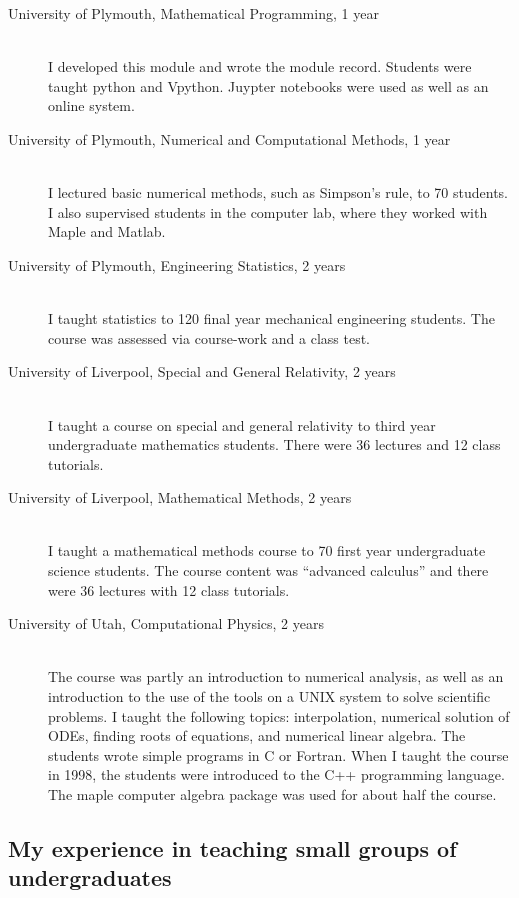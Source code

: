 \documentclass[12pt]{article}
\begin{document}
\begin{description}
  \item[University of Plymouth, Mathematical Programming,
1 year] \hfill \\
I developed this module and wrote the module record. Students
were taught python and Vpython. Juypter notebooks were used as well
as an online system.

  \item[University of Plymouth, Numerical and Computational Methods,
1 year] \hfill \\
I lectured basic numerical methods,
such as Simpson's rule,
 to 70 students. I also supervised
students in the computer lab, where they worked with Maple
and Matlab.

  \item[University of Plymouth, Engineering Statistics,
2 years] \hfill \\
I taught statistics to 120 final year mechanical engineering 
students. The course was assessed via course-work and a class 
test.

  \item[University of Liverpool, Special and General
Relativity,
2 years] \hfill \\
I taught a course on special and general
relativity to third year undergraduate mathematics students. 
There were 36 lectures and 12 class tutorials.

  \item[University of Liverpool, Mathematical Methods, 2 years] \hfill \\
I taught a mathematical methods course
 to 70 first year undergraduate science students.  The course
content was ``advanced calculus'' and there were 36 lectures 
with 12 class tutorials.


\item[University of Utah, Computational Physics, 2 years] \hfill \\
The course was partly an introduction to numerical
analysis, as well as an introduction to the use of the tools on a UNIX
system to solve scientific problems.  I taught the following topics:
interpolation, numerical solution of ODEs, finding roots of
equations, and numerical linear algebra.  The students wrote simple
programs in C or Fortran. When I taught the course in 1998, the
students were introduced to the C++ programming language. The maple
computer algebra package was used for about half the course.


\end{description}

\subsection{My experience in teaching small groups of undergraduates}
\end{document}
